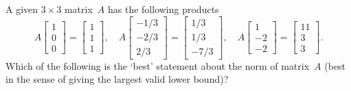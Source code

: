 \begin{activity}
A given \(3\times3\) matrix~\(A\) has the following products
\begin{equation*}
A\begin{bmatrix} 1\\0\\0 \end{bmatrix}
=\begin{bmatrix} 1\\1\\1 \end{bmatrix},\quad
A\begin{bmatrix} -1/3\\-2/3\\2/3 \end{bmatrix}
=\begin{bmatrix} 1/3\\1/3\\-7/3 \end{bmatrix},\quad
A\begin{bmatrix} 1\\-2\\-2 \end{bmatrix}
=\begin{bmatrix} 11\\3\\3 \end{bmatrix}.
\end{equation*}
Which of the following is the `best' statement about the norm of matrix~\(A\) (best in the sense of giving the largest valid lower bound)?
\end{activity}



